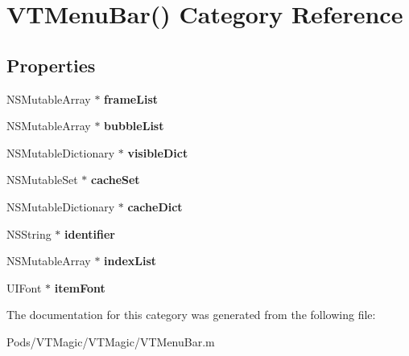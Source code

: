 \hypertarget{category_v_t_menu_bar_07_08}{}\section{V\+T\+Menu\+Bar() Category Reference}
\label{category_v_t_menu_bar_07_08}
\subsection*{Properties}
\begin{DoxyCompactItemize}
\item 
\mbox{\label{category_v_t_menu_bar_07_08_a13250588c78c1a592f5efff4ce639e34}} 
N\+S\+Mutable\+Array $\ast$ {\bfseries frame\+List}
\item 
\mbox{\label{category_v_t_menu_bar_07_08_aa8ba3f7436f47d8b623e666ba02cccd3}} 
N\+S\+Mutable\+Array $\ast$ {\bfseries bubble\+List}
\item 
\mbox{\label{category_v_t_menu_bar_07_08_a350e8ccec96d834dde70f676bb38f0c7}} 
N\+S\+Mutable\+Dictionary $\ast$ {\bfseries visible\+Dict}
\item 
\mbox{\label{category_v_t_menu_bar_07_08_a40f7ec165491061a5960ab0c2d21e35b}} 
N\+S\+Mutable\+Set $\ast$ {\bfseries cache\+Set}
\item 
\mbox{\label{category_v_t_menu_bar_07_08_a22c4fa209f149afd5c4e3018b28f52be}} 
N\+S\+Mutable\+Dictionary $\ast$ {\bfseries cache\+Dict}
\item 
\mbox{\label{category_v_t_menu_bar_07_08_ab820f08d1b6b5f6300a0ff043362cf6e}} 
N\+S\+String $\ast$ {\bfseries identifier}
\item 
\mbox{\label{category_v_t_menu_bar_07_08_a053334c587a9958afdd4b05134767e1e}} 
N\+S\+Mutable\+Array $\ast$ {\bfseries index\+List}
\item 
\mbox{\label{category_v_t_menu_bar_07_08_a15d3a024bf7cf14a8c9db53df4fde842}} 
U\+I\+Font $\ast$ {\bfseries item\+Font}
\end{DoxyCompactItemize}


The documentation for this category was generated from the following file\+:\begin{DoxyCompactItemize}
\item 
Pods/\+V\+T\+Magic/\+V\+T\+Magic/V\+T\+Menu\+Bar.\+m\end{DoxyCompactItemize}
